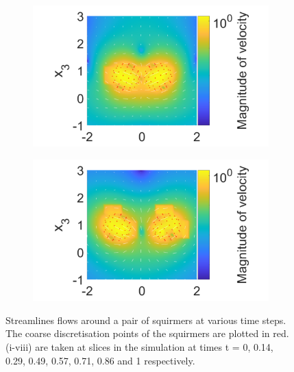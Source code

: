\begin{figure}
\begin{subfigure}[b]{0.4\textwidth}
    \caption[]{\label{fig:PairF}}
\end{subfigure}
\begin{subfigure}[b]{0.4\textwidth}
    \centering
    \includegraphics[width=\textwidth]{Images/squirmers/Pair-7.pdf}
    \caption[]{\label{fig:PairG}}
\end{subfigure}
\begin{subfigure}[b]{0.4\textwidth}
    \centering
    \includegraphics[width=\textwidth]{Images/squirmers/Pair-8.pdf}
    \caption[]{\label{fig:PairH}}
\end{subfigure}
\caption[Streamlines flows around a pair of squirmers.]{\label{fig:Squiremer3DFlowPair}Streamlines flows around a pair of squirmers at various time steps. The coarse discretisation points of the squirmers are plotted in red. (i-viii) are taken at slices in the simulation at times t = 0, 0.14, 0.29, 0.49, 0.57, 0.71, 0.86 and 1 respectively.}
\end{figure}

